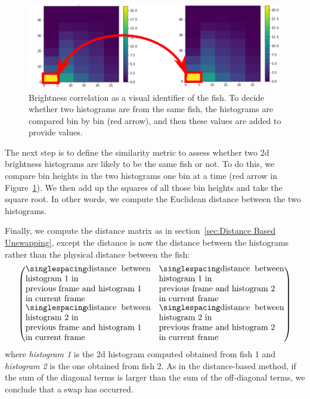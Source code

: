 \documentclass{article}
\begin{document}
\begin{figure}[H]
	\centering
	\includegraphics[width=\linewidth]{twoHist}
	\caption{Brightness correlation as a visual identifier of the fish. To decide whether two histograms are from the same fish, the histograms are compared bin by bin (red arrow), and then these values are added to provide values.}
	\label{fig:singleHist}
\end{figure}

The next step is to define the similarity metric to assess whether two 2d brightness histograms are likely to be the same fish or not. To do this, we compare bin heights in the two histograms one bin at a time (red arrow in Figure~\ref{fig:singleHist}). We then add up the squares of all those bin heights and take the square root. In other words, we compute the Euclidean distance between the two histograms.

Finally, we compute the distance matrix as in section~\ref{sec:Distance Based Unswapping}, except the distance is now the distance between the histograms rather than the physical distance between the fish:
\begin{equation}
	\begin{pmatrix}
	\text{\myMatrixItem{distance between histogram 1 in \\ previous frame and histogram 1 \\ in current frame}} 
	& \text{\myMatrixItem{distance between histogram 1 in \\ previous frame and histogram 2 \\ in current frame}} 
	\\
	\text{\myMatrixItem{distance between histogram 2 in \\ previous frame and histogram 1 \\ in current frame}} 
	& \text{\myMatrixItem{distance between histogram 2 in \\ previous frame and histogram 2 \\ in current frame}} 
	\end{pmatrix}
	\nonumber
\end{equation} 
where \emph{histogram 1} is the 2d histogram computed obtained from fish 1 and \emph{histogram 2} is the one obtained from fish 2.
As in the distance-based method, if the sum of the diagonal terms is larger than the sum of the off-diagonal terms, we conclude that a swap has occurred.
\end{document}

